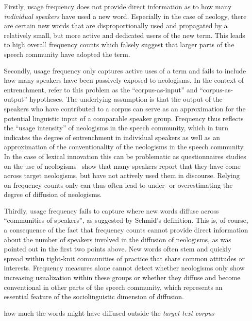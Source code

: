 \documentclass[
  a4paper,
  abstract=on,
  captions=tableabove
  ]{scrartcl}
\begin{document}
    Firstly, usage frequency does not provide direct information as to how many \emph{individual speakers} have used a new word. Especially in the case of neology, there are certain new words that are disproportionally used and propagated by a relatively small, but more active and dedicated users of the new term. This leads to high overall frequency counts which falsely suggest that larger parts of the speech community have adopted the term.

    Secondly, usage frequency only captures active uses of a term and fails to include how many speakers have been passively exposed to neologisms. In the context of entrenchment, \textcite{Stefanowitsch2017CorpusbasedPerspective} refer to this problem as the \enquote{corpus-as-input} and \enquote{corpus-as-output} hypotheses. The underlying assumption is that the output of the speakers who have contributed to a corpus can serve as an approximation for the potential linguistic input of a comparable speaker group. Frequency thus reflects the \enquote{usage intensity} of neologisms in the speech community, which in turn indicates the degree of entrenchment in individual speakers as well as an approximation of the conventionality of the neologisms in the speech community. In the case of lexical innovation this can be problematic as questionnaires studies on the use of neologisms~\parencite{Kerremans2015WebNew} show that many speakers report that they have come across target neologisms, but have not actively used them in discourse. Relying on frequency counts only can thus often lead to under- or overestimating the degree of diffusion of neologisms.

    Thirdly, usage frequency fails to capture where new words diffuse across \enquote{communities of speakers}, as suggested by Schmid's definition. This is, of course, a consequence of the fact that frequency counts cannot provide direct information about the number of speakers involved in the diffusion of neologisms, as was pointed out in the first two points above. New words often stem and quickly spread within tight-knit communities of practice that share common attitudes or interests. Frequency measures alone cannot detect whether neologisms only show increasing usualization within these groups or whether they diffuse and become conventional in other parts of the speech community, which represents an essential feature of the sociolinguistic dimension of diffusion.


    how much the words might have diffused outside the \emph{target text corpus}
\end{document}
